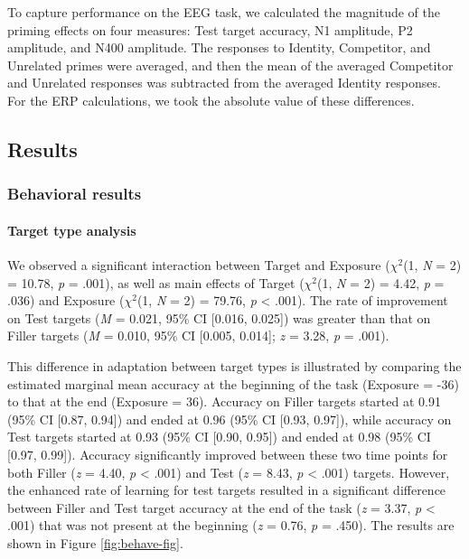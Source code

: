 \documentclass[
  12pt,
  twoside]{article}
\begin{document}
To capture performance on the EEG task, we calculated the magnitude of the priming effects on four measures: Test target accuracy, N1 amplitude, P2 amplitude, and N400 amplitude.
The responses to Identity, Competitor, and Unrelated primes were averaged, and then the mean of the averaged Competitor and Unrelated responses was subtracted from the averaged Identity responses.
For the ERP calculations, we took the absolute value of these differences.

\hypertarget{results-4}{%
\subsection{Results}\label{results-4}}

\hypertarget{behavioral-results}{%
\subsubsection{Behavioral results}\label{behavioral-results}}

\hypertarget{target-type-analysis}{%
\paragraph{Target type analysis}\label{target-type-analysis}}

We observed a significant interaction between Target and Exposure (\(\chi^2\)(1, \emph{N} = 2) = 10.78, \emph{p} = .001), as well as main effects of Target (\(\chi^2\)(1, \emph{N} = 2) = 4.42, \emph{p} = .036) and Exposure (\(\chi^2\)(1, \emph{N} = 2) = 79.76, \emph{p} \textless{} .001).
The rate of improvement on Test targets (\emph{M} = 0.021, 95\% CI {[}0.016, 0.025{]}) was greater than that on Filler targets (\emph{M} = 0.010, 95\% CI {[}0.005, 0.014{]}; \emph{z} = 3.28, \emph{p} = .001).

This difference in adaptation between target types is illustrated by comparing the estimated marginal mean accuracy at the beginning of the task (Exposure = -36) to that at the end (Exposure = 36).
Accuracy on Filler targets started at 0.91 (95\% CI {[}0.87, 0.94{]}) and ended at 0.96 (95\% CI {[}0.93, 0.97{]}), while accuracy on Test targets started at 0.93 (95\% CI {[}0.90, 0.95{]}) and ended at 0.98 (95\% CI {[}0.97, 0.99{]}).
Accuracy significantly improved between these two time points for both Filler (\emph{z} = 4.40, \emph{p} \textless{} .001) and Test (\emph{z} = 8.43, \emph{p} \textless{} .001) targets.
However, the enhanced rate of learning for test targets resulted in a significant difference between Filler and Test target accuracy at the end of the task (\emph{z} = 3.37, \emph{p} \textless{} .001) that was not present at the beginning (\emph{z} = 0.76, \emph{p} = .450).
The results are shown in Figure \ref{fig:behave-fig}.
\end{document}

